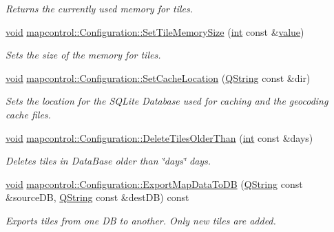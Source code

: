 \begin{DoxyCompactItemize}
\begin{DoxyCompactList}\small\item\em Returns the currently used memory for tiles. \end{DoxyCompactList}\item 
\hyperlink{group___u_a_v_objects_plugin_ga444cf2ff3f0ecbe028adce838d373f5c}{void} \hyperlink{group___o_p_map_widget_gaa6bfe2092080fa7a3464cece122819b5}{mapcontrol\-::\-Configuration\-::\-Set\-Tile\-Memory\-Size} (\hyperlink{ioapi_8h_a787fa3cf048117ba7123753c1e74fcd6}{int} const \&\hyperlink{glext_8h_aa0e2e9cea7f208d28acda0480144beb0}{value})
\begin{DoxyCompactList}\small\item\em Sets the size of the memory for tiles. \end{DoxyCompactList}\item 
\hyperlink{group___u_a_v_objects_plugin_ga444cf2ff3f0ecbe028adce838d373f5c}{void} \hyperlink{group___o_p_map_widget_ga735443d74919b6c74f91fbf1f0576931}{mapcontrol\-::\-Configuration\-::\-Set\-Cache\-Location} (\hyperlink{group___u_a_v_objects_plugin_gab9d252f49c333c94a72f97ce3105a32d}{Q\-String} const \&dir)
\begin{DoxyCompactList}\small\item\em Sets the location for the S\-Q\-Lite Database used for caching and the geocoding cache files. \end{DoxyCompactList}\item 
\hyperlink{group___u_a_v_objects_plugin_ga444cf2ff3f0ecbe028adce838d373f5c}{void} \hyperlink{group___o_p_map_widget_ga66137fefcd998b31354b7c0c4575b40a}{mapcontrol\-::\-Configuration\-::\-Delete\-Tiles\-Older\-Than} (\hyperlink{ioapi_8h_a787fa3cf048117ba7123753c1e74fcd6}{int} const \&days)
\begin{DoxyCompactList}\small\item\em Deletes tiles in Data\-Base older than \char`\"{}days\char`\"{} days. \end{DoxyCompactList}\item 
\hyperlink{group___u_a_v_objects_plugin_ga444cf2ff3f0ecbe028adce838d373f5c}{void} \hyperlink{group___o_p_map_widget_ga373e3935f7b6ce79ca89a7bbfdff8a00}{mapcontrol\-::\-Configuration\-::\-Export\-Map\-Data\-To\-D\-B} (\hyperlink{group___u_a_v_objects_plugin_gab9d252f49c333c94a72f97ce3105a32d}{Q\-String} const \&source\-D\-B, \hyperlink{group___u_a_v_objects_plugin_gab9d252f49c333c94a72f97ce3105a32d}{Q\-String} const \&dest\-D\-B) const 
\begin{DoxyCompactList}\small\item\em Exports tiles from one D\-B to another. Only new tiles are added. \end{DoxyCompactList}\item 

\end{DoxyCompactItemize}
